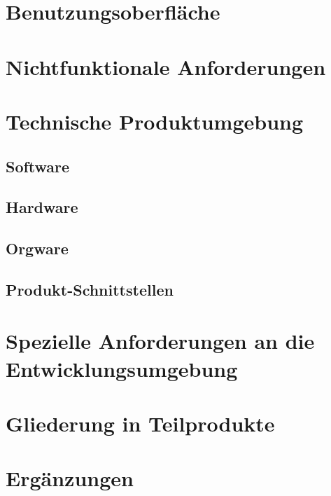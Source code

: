 \documentclass[pdflatex, a4paper, oneside]{scrartcl}
\begin{document}
	\section{Benutzungsoberfläche}
	\section{Nichtfunktionale Anforderungen}
	\section{Technische Produktumgebung}
		\subsection{Software}
		\subsection{Hardware}
		\subsection{Orgware}
		\subsection{Produkt-Schnittstellen}
	\section{Spezielle Anforderungen an die Entwicklungsumgebung}
	\section{Gliederung in Teilprodukte}
	\section{Ergänzungen}
\end{document}
